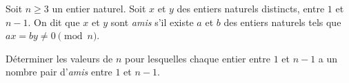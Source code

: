 Soit $n\ge 3$ un entier naturel.
Soit $x$ et $y$ des entiers naturels distincts, entre $1$ et $n - 1$. On dit que $x$ et $y$ sont \textit{amis} s'il existe $a$ et $b$ des entiers naturels tels que $ax = by \ne 0\pmod n$.

Déterminer les valeurs de $n$ pour lesquelles chaque entier entre $1$ et $n-1$ a un nombre pair d'\textit{amis} entre $1$ et $n-1$.
